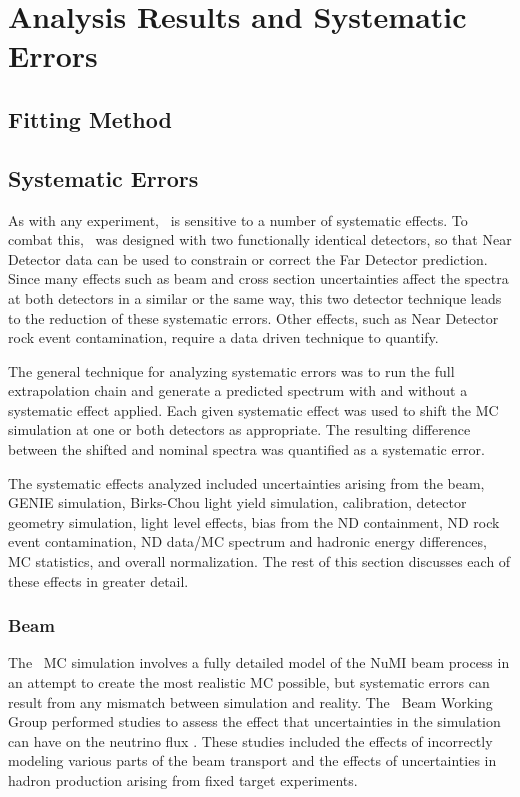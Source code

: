 \chapter{Analysis Results and Systematic Errors}

\section{Fitting Method}

\section{Systematic Errors}

As with any experiment, \nova~is sensitive to a number of systematic effects. To combat this, \nova~was designed with two functionally identical detectors, so that Near Detector data can be used to constrain or correct the Far Detector prediction. Since many effects such as beam and cross section uncertainties affect the spectra at both detectors in a similar or the same way, this two detector technique leads to the reduction of these systematic errors. Other effects, such as Near Detector rock event contamination, require a data driven technique to quantify.

The general technique for analyzing systematic errors was to run the full extrapolation chain and generate a predicted spectrum with and without a systematic effect applied. Each given systematic effect was used to shift the MC simulation at one or both detectors as appropriate. The resulting difference between the shifted and nominal spectra was quantified as a systematic error.

The systematic effects analyzed included uncertainties arising from the beam, GENIE simulation, Birks-Chou light yield simulation, calibration, detector geometry simulation, light level effects, bias from the ND containment, ND rock event contamination, ND data/MC spectrum and hadronic energy differences, MC statistics, and overall normalization. The rest of this section discusses each of these effects in greater detail.

\subsection{Beam}

The \nova~MC simulation involves a fully detailed model of the NuMI beam process in an attempt to create the most realistic MC possible, but systematic errors can result from any mismatch between simulation and reality. The \nova~Beam Working Group performed studies to assess the effect that uncertainties in the simulation can have on the neutrino flux \cite{ref:TNBeam}. These studies included the effects of incorrectly modeling various parts of the beam transport and the effects of uncertainties in hadron production arising from fixed target experiments.

